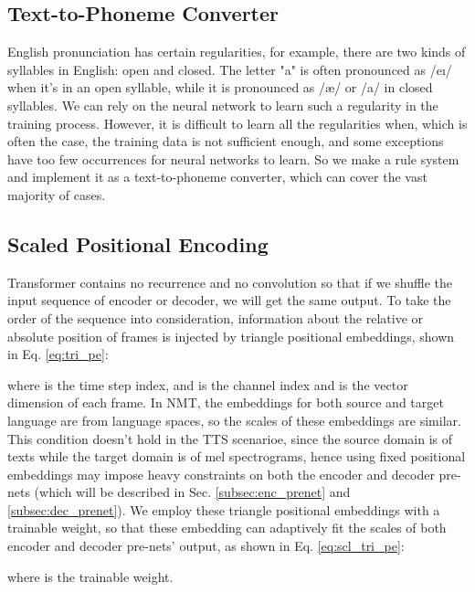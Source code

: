 \documentclass[letterpaper]{article} \usepackage{aaai19}  \usepackage{times}  \usepackage{helvet}  \usepackage{courier}  \usepackage{url}  \usepackage{graphicx}  \frenchspacing
\begin{document}
\subsection{Text-to-Phoneme Converter}

English pronunciation has certain regularities, for example, there are two kinds of syllables in English: open and closed. The letter "a" is often pronounced as /e\i/ when it's in an open syllable, while it is pronounced as /\ae/ or /a\textlengthmark/ in closed syllables. We can rely on the neural network to learn such a regularity in the training process. However, it is difficult to learn all the regularities when, which is often the case, the training data is not sufficient enough, and some exceptions have too few occurrences for neural networks to learn. So we make a rule system and implement it as a text-to-phoneme converter, which can cover the vast majority of cases.

\subsection{Scaled Positional Encoding}
\label{subsec:scl_tri_pe}

Transformer contains no recurrence and no convolution so that if we shuffle the input sequence of encoder or decoder, we will get the same output. To take the order of the sequence into consideration, information about the relative or absolute position of frames is injected by triangle positional embeddings, shown in Eq. \ref{eq:tri_pe}:

where  is the time step index,  and  is the channel index and  is the vector dimension of each frame. In NMT, the embeddings for both source and target language are from language spaces, so the scales of these embeddings are similar. This condition doesn't hold in the TTS scenarioe, since the source domain is of texts while the target domain is of mel spectrograms, hence using fixed positional embeddings may impose heavy constraints on both the encoder and decoder pre-nets (which will be described in Sec. \ref{subsec:enc_prenet} and \ref{subsec:dec_prenet}). We employ these triangle positional embeddings with a trainable weight, so that these embedding can adaptively fit the scales of both encoder and decoder pre-nets' output, as shown in Eq. \ref{eq:scl_tri_pe}:

where  is the trainable weight.
\end{document}
